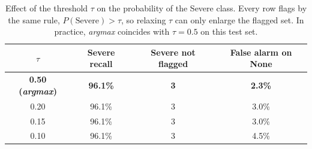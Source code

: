 \begin{table}[!t]
\centering
\caption{Effect of the threshold $\tau$ on the probability of the Severe class. Every row flags by the same rule, $P(\text{Severe}) > \tau$, so relaxing $\tau$ can only enlarge the flagged set. In practice, \emph{argmax} coincides with $\tau = 0.5$ on this test set.}
\label{tab:limiar}
\begin{tabular}{cccc}
\toprule
$\tau$ & Severe recall & Severe not flagged & False alarm on None \\
\midrule
\textbf{0.50 (\emph{argmax})} & \textbf{96.1\%} & \textbf{3} & \textbf{2.3\%} \\
0.20 & 96.1\% & 3 & 3.0\% \\
0.15 & 96.1\% & 3 & 3.0\% \\
0.10 & 96.1\% & 3 & 4.5\% \\
\bottomrule
\end{tabular}
\end{table}
